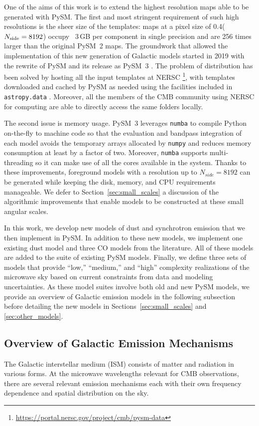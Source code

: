 \documentclass[twocolumn]{aastex631}
\begin{document}
One of the aims of this work is to extend the highest resolution maps able to be generated with PySM. The first and most stringent requirement of such high resolutions is the sheer size of the templates: maps at a pixel size of 0.4\arcmin ($N_{\rm side}=8192$) occupy ~3\,GB per component in single precision and are 256 times larger than the original PySM~2 maps. The groundwork that allowed the implementation of this new generation of Galactic models started in 2019 with the rewrite of PySM and its release as PySM~3 \citep[see][for details]{Zonca:2021}. The problem of distribution has been solved by hosting all the input templates at NERSC \footnote{\url{https://portal.nersc.gov/project/cmb/pysm-data}}, with templates downloaded and cached by PySM as needed using the facilities included in \texttt{astropy.data} \citep{AstropyCollaboration:2013, AstropyCollaboration:2018}. Moreover, all the members of the CMB community using NERSC for computing are able to directly access the same folders locally.

The second issue is memory usage. PySM~3 leverages \texttt{numba} \citep{Lam:2015} to compile Python on-the-fly to machine code so that the evaluation and bandpass integration of each model avoids the temporary arrays allocated by \texttt{numpy} and reduces memory consumption at least by a factor of two. Moreover, \texttt{numba} supports multi-threading so it can make use of all the cores available in the system. Thanks to these improvements, foreground models with a resolution up to $N_{side}=8192$ can be generated while keeping the disk, memory, and CPU requirements manageable. We defer to Section~\ref{sec:small_scales} a discussion of the algorithmic improvements that enable models to be constructed at these small angular scales.

In this work, we develop new models of dust and synchrotron emission that we then implement in PySM. In addition to these new models, we implement one existing dust model and three CO models from the literature. All of these models are added to the suite of existing PySM models. Finally, we define three sets of models that provide ``low,'' ``medium,'' and ``high'' complexity realizations of the microwave sky based on current constraints from data and modeling uncertainties. As these model suites involve both old and new PySM models, we provide an overview of Galactic emission models in the following subsection before detailing the new models in Sections~\ref{sec:small_scales} and \ref{sec:other_models}.

\subsection{Overview of Galactic Emission Mechanisms} \label{sec:emission_mechanisms}
The Galactic interstellar medium (ISM) consists of matter and radiation in various forms. At the microwave wavelengths relevant for CMB observations, there are several relevant emission mechanisms each with their own frequency dependence and spatial distribution on the sky.
\end{document}
